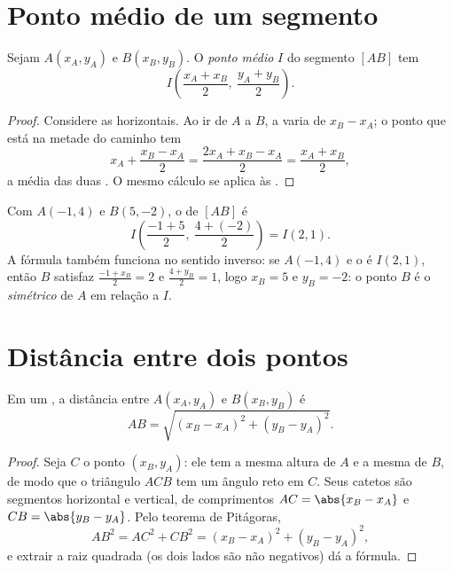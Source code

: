 \section{Ponto médio de um segmento}

\begin{proposition}\label{prop:g10:coordgeom:midpoint}
Sejam $A(x_A, y_A)$ e $B(x_B, y_B)$. O \emph{ponto médio} $I$ do segmento $[AB]$ tem 
\[
I\left(\frac{x_A + x_B}{2},\ \frac{y_A + y_B}{2}\right).
\]
\end{proposition}

\begin{proof}
Considere as  horizontais. Ao ir de $A$ a $B$, a 
varia de $x_B - x_A$; o ponto que está na metade do caminho tem 
\[
x_A + \frac{x_B - x_A}{2} = \frac{2x_A + x_B - x_A}{2}
= \frac{x_A + x_B}{2},
\]
a média das duas . O mesmo cálculo se aplica às .
\end{proof}

\begin{example}\label{ex:g10:coordgeom:midpoint}
Com $A(-1, 4)$ e $B(5, -2)$, o  de $[AB]$ é
\[
I\left(\frac{-1 + 5}{2},\ \frac{4 + (-2)}{2}\right) = I(2, 1).
\]
A fórmula também funciona no sentido inverso: se $A(-1, 4)$ e o  é $I(2, 1)$, então $B$ satisfaz $\frac{-1 + x_B}{2} = 2$ e
$\frac{4 + y_B}{2} = 1$, logo $x_B = 5$ e $y_B = -2$: o ponto $B$ é o
\emph{simétrico} de $A$ em relação a $I$.
\end{example}

\section{Distância entre dois pontos}

\begin{theorem}\label{thm:g10:coordgeom:distance}
Em um , a distância entre $A(x_A, y_A)$ e
$B(x_B, y_B)$ é
\[
AB = \sqrt{(x_B - x_A)^2 + (y_B - y_A)^2}.
\]
\end{theorem}

\begin{proof}
Seja $C$ o ponto $(x_B, y_A)$: ele tem a mesma altura de $A$ e a mesma
 de $B$, de modo que o triângulo $ACB$ tem um ângulo reto em $C$.
Seus catetos são segmentos horizontal e vertical, de comprimentos
$AC = \abs{x_B - x_A}$ e $CB = \abs{y_B - y_A}$. Pelo teorema de
Pitágoras,
\[
AB^2 = AC^2 + CB^2 = (x_B - x_A)^2 + (y_B - y_A)^2,
\]
e extrair a raiz quadrada (os dois lados são não negativos) dá a
fórmula.
\end{proof}


